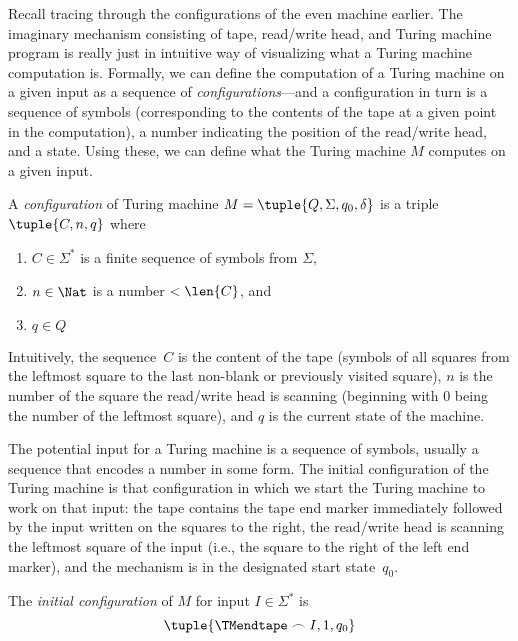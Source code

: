 \documentclass[../../../include/open-logic-section]{subfiles}
\begin{document}

\begin{explain}
Recall tracing through the configurations of the even machine earlier.
The imaginary mechanism consisting of tape, read/write head, and
Turing machine program is really just in intuitive way of visualizing
what a Turing machine computation is.  Formally, we can define the
computation of a Turing machine on a given input as a sequence of
\emph{configurations}---and a configuration in turn is a sequence of
symbols (corresponding to the contents of the tape at a given point in
the computation), a number indicating the position of the read/write
head, and a state.  Using these, we can define what the Turing machine
$M$ computes on a given input.
\end{explain}

\begin{defn}[Configuration]
A \emph{configuration} of Turing machine $M = \tuple{Q, \Sigma, q_0,
\delta}$ is a triple $\tuple{C, n, q}$ where
\begin{enumerate}
\item $C \in \Sigma^*$ is a finite sequence of symbols from $\Sigma$,
\item $n \in \Nat$ is a number $< \len{C}$, and
\item $q \in Q$
\end{enumerate}
Intuitively, the sequence~$C$ is the content of the tape (symbols of
all squares from the leftmost square to the last non-blank or
previously visited square), $n$ is the number of the square the
read/write head is scanning (beginning with $0$ being the number of
the leftmost square), and $q$ is the current state of the machine.
\end{defn}

\begin{explain}
The potential input for a Turing machine is a sequence of symbols,
usually a sequence that encodes a number in some form.  The initial
configuration of the Turing machine is that configuration in which we
start the Turing machine to work on that input: the tape contains the
tape end marker immediately followed by the input written on the
squares to the right, the read/write head is scanning the leftmost
square of the input (i.e., the square to the right of the left end
marker), and the mechanism is in the designated start state~$q_0$.
\end{explain}

\begin{defn}
The \emph{initial configuration} of $M$ for input $I \in \Sigma^*$ is
\[
\tuple{\TMendtape \frown I, 1, q_0}
\]
\end{defn}
\end{document}
